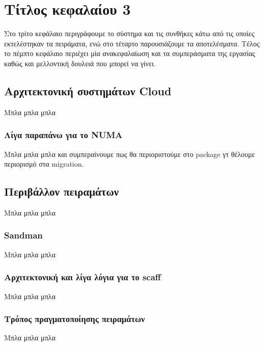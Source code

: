 \chapter{Τίτλος κεφαλαίου 3}
Στο τρίτο κεφάλαιο περιγράφουμε το σύστημα και τις συνθήκες κάτω από τις οποίες
εκτελέστηκαν τα πειράματα, ενώ στο τέταρτο παρουσιάζουμε τα αποτελέσματα. Τέλος
το πέμπτο κεφάλαιο περιέχει μία ανακεφαλαίωση και τα συμπεράσματα της εργασίας
καθώς και μελλοντική δουλειά που μπορεί να γίνει.
\section{Αρχιτεκτονική συστημάτων Cloud}
Μπλα μπλα μπλα
\subsection{Λίγα παραπάνω για το NUMA}
Μπλα μπλα μπλα και συμπεραίνουμε πως θα περιοριστούμε στο package γτ θέλουμε
περιορισμό στα migration.
\section{Περιβάλλον πειραμάτων}
Μπλα μπλα μπλα
\subsection{Sandman}
Μπλα μπλα μπλα
\subsection{Αρχιτεκτονική και λίγα λόγια για το scaff}
Μπλα μπλα μπλα
\subsection{Τρόπος πραγματοποίησης πειραμάτων}
Μπλα μπλα μπλα
